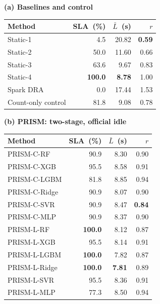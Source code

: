 \caption{Official workload at idle ($K=0$). SLA compares per-query means over repetitions with matched Static-4 targets. $\bar L$: mean latency (s); $r$: total core-hour ratio to Static-4. Bold: panel-wise optima (higher SLA; lower latency and cost).}\label{tab:broad}\centering\scriptsize
\setlength{\tabcolsep}{2.5pt}\renewcommand{\arraystretch}{1.06}
\begin{minipage}[t]{.485\textwidth}\centering\textbf{(a) Baselines and control}\par\smallskip
\begin{tabular*}{\linewidth}{@{\extracolsep{\fill}}lrrr@{}}\toprule
\mbox{Method} & \mbox{SLA (\%)} & \mbox{$\bar L$ (s)} & \mbox{$r$}\\\midrule
Static-1 & 4.5 & 20.82 & \textbf{0.59}\\
Static-2 & 50.0 & 11.60 & 0.66\\
Static-3 & 63.6 & 9.67 & 0.83\\
Static-4 & \textbf{100.0} & \textbf{8.78} & 1.00\\
Spark DRA & 0.0 & 17.44 & 1.53\\
Count-only control & 81.8 & 9.08 & 0.78\\
\bottomrule\end{tabular*}\end{minipage}
\hfill\begin{minipage}[t]{.485\textwidth}\centering\textbf{(b) PRISM: two-stage, official idle}\par\smallskip
\begin{tabular*}{\linewidth}{@{\extracolsep{\fill}}lrrr@{}}\toprule
\mbox{Method} & \mbox{SLA (\%)} & \mbox{$\bar L$ (s)} & \mbox{$r$}\\\midrule
PRISM-C-RF & 90.9 & 8.30 & 0.90\\
PRISM-C-XGB & 95.5 & 8.58 & 0.91\\
PRISM-C-LGBM & 81.8 & 8.85 & 0.94\\
PRISM-C-Ridge & 90.9 & 8.07 & 0.90\\
PRISM-C-SVR & 90.9 & 8.47 & \textbf{0.84}\\
PRISM-C-MLP & 90.9 & 8.37 & 0.90\\
PRISM-L-RF & \textbf{100.0} & 8.12 & 0.87\\
PRISM-L-XGB & 95.5 & 8.14 & 0.91\\
PRISM-L-LGBM & \textbf{100.0} & 7.82 & 0.87\\
PRISM-L-Ridge & \textbf{100.0} & \textbf{7.81} & 0.89\\
PRISM-L-SVR & 95.5 & 8.36 & 0.91\\
PRISM-L-MLP & 77.3 & 8.50 & 0.94\\
\bottomrule\end{tabular*}\end{minipage}
